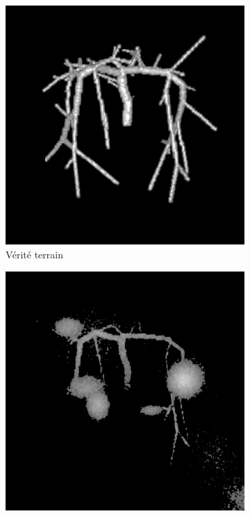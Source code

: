 \begin{figure}[!ht]
  \captionsetup[subfigure]{justification=centering}
  \begin{subfigure}[t]{0.32\textwidth}
    \includegraphics[clip = true, trim = 80 80 80 80,width=\textwidth]{Images/Vascu_4_GT.png}
    \caption{Vérité terrain}  
  \end{subfigure}
  \begin{subfigure}[t]{0.32\textwidth}
    \includegraphics[clip = true, trim = 80 80 80 80,width=\textwidth]{Images/Vascu_4_Baseline.png}

\end{subfigure}
\end{figure}
